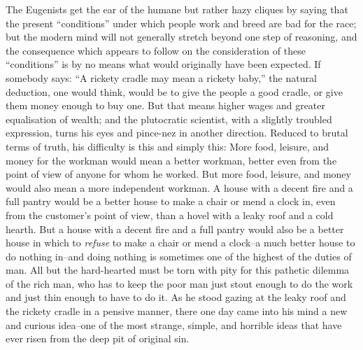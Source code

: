 \documentclass{book}
\begin{document}
The Eugenists get the ear of the humane but rather hazy cliques by saying that the present “conditions” under which people work and breed are bad for the race; but the modern mind will not generally stretch beyond one step of reasoning, and the consequence which appears to follow on the consideration of these “conditions” is by no means what would originally have been expected. If somebody says: “A rickety cradle may mean a rickety baby,” the natural deduction, one would think, would be to give the people a good cradle, or give them money enough to buy one. But that means higher wages and greater equalisation of wealth; and the plutocratic scientist, with a slightly troubled expression, turns his eyes and pince-nez in another direction. Reduced to brutal terms of truth, his difficulty is this and simply this: More food, leisure, and money for the workman would mean a better workman, better even from the point of view of anyone for whom he worked. But more food, leisure, and money would also mean a more independent workman. A house with a decent fire and a full pantry would be a better house to make a chair or mend a clock in, even from the customer’s point of view, than a hovel with a leaky roof and a cold hearth. But a house with a decent fire and a full pantry would also be a better house in which to \emph{refuse} to make a chair or mend a clock–a much better house to do nothing in–and doing nothing is sometimes one of the highest of the duties of man. All but the hard-hearted must be torn with pity for this pathetic dilemma of the rich man, who has to keep the poor man just stout enough to do the work and just thin enough to have to do it. As he stood gazing at the leaky roof and the rickety cradle in a pensive manner, there one day came into his mind a new and curious idea–one of the most strange, simple, and horrible ideas that have ever risen from the deep pit of original sin.
\end{document}
